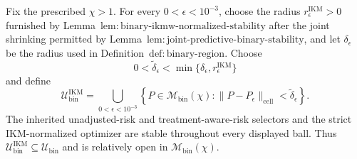 Fix the prescribed \(\chi>1\). For every \(0<\epsilon<10^{-3}\), choose the radius \(r_\epsilon^{\mathrm{IKM}}>0\) furnished by Lemma~\(\mathrm{lem{:}binary\text{-}ikmw\text{-}normalized\text{-}stability}\) after the joint shrinking permitted by Lemma~\(\mathrm{lem{:}joint\text{-}predictive\text{-}binary\text{-}stability}\), and let \(\delta_\epsilon\) be the radius used in Definition~\(\mathrm{def{:}binary\text{-}region}\). Choose
\[
 0<\widetilde\delta_\epsilon
 <\min\{\delta_\epsilon,r_\epsilon^{\mathrm{IKM}}\}
\]
and define
\[
 \mathcal U_{\mathrm{bin}}^{\mathrm{IKM}}
 =\bigcup_{0<\epsilon<10^{-3}}
 \left\{P\in\mathcal M_{\mathrm{bin}}(\chi):
 \|P-P_\epsilon\|_{\mathrm{cell}}<\widetilde\delta_\epsilon\right\}. \tag{1}
\]
The inherited unadjusted-risk and treatment-aware-risk selectors and the strict IKM-normalized optimizer are stable throughout every displayed ball. Thus \(\mathcal U_{\mathrm{bin}}^{\mathrm{IKM}}\subseteq\mathcal U_{\mathrm{bin}}\) and is relatively open in \(\mathcal M_{\mathrm{bin}}(\chi)\).